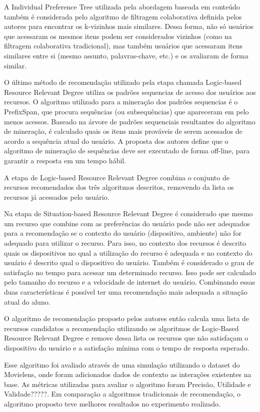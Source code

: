 A Individual Preference Tree utilizada pela abordagem baseada em conteúdo também é considerada pelo algoritmo de
filtragem colaborativa definida pelos autores para encontrar os k-vizinhos mais similares. Dessa forma, não só usuários
que acessaram os mesmos itens podem ser considerados vizinhos (como na filtragem colaborativa tradicional), mas também
usuários que acessaram itens similares entre si (mesmo assunto, palavras-chave, etc.) e os avaliaram de forma similar.

O último método de recomendação utilizado pela etapa chamada Logic-based Resource Relevant Degree utiliza os padrões
sequencias de acesso dos usuários aos recursos. O algoritmo utilizado para a mineração dos padrões sequencias é o
PrefixSpan, que procura sequências (ou subsequências) que apareceram em pelo menos  acessos. Baseado na árvore de
padrões sequenciais resultantes do algoritmo de mineração, é calculado quais os itens mais prováveis de serem acessados
de acordo a sequência atual do usuário. A proposta dos autores define que o algoritmo de mineração de sequências deve
ser executado de forma off-line, para garantir a resposta em um tempo hábil.

A etapa de Logic-based Resource Relevant Degree combina o conjunto de recursos recomendados dos três algoritmos
descritos, removendo da lista os recursos já acessados pelo usuário.

Na etapa de Situation-based Resource Relevant Degree é considerado que mesmo um recurso que combine com as preferências
do usuário pode não ser adequados para a recomendação se o contexto do usuário (dispositivo, ambiente) não for adequado
para utilizar o recurso. Para isso, no contexto dos recursos é descrito quais os dispositivos no qual a utilização do
recurso é adequada e no contexto do usuário é descrito qual o dispositivo do usuário. Também é considerado o grau de
satisfação no tempo para acessar um determinado recurso. Isso pode ser calculado pelo tamanho do recurso e a velocidade
de internet do usuário. Combinando essas duas características é possível ter uma recomendação mais adequada a situação
atual do aluno.

O algoritmo de recomendação proposto pelos autores então calcula uma lista de recursos candidatos a recomendação
utilizando os algoritmos de Logic-Based Resource Relevant Degree e remove dessa lista os recursos que não satisfaçam o
dispositivo do usuário e a satisfação mínima com o tempo de resposta esperado.

Esse algoritmo foi avaliado através de uma simulação utilizando o dataset do Movielens, onde foram adicionados dados de
contexto as interações existentes na base. As métricas utilizadas para avaliar o algoritmo foram Precisão, Utilidade e
Validade?????. Em comparação a algoritmos tradicionais de recomendação, o algoritmo proposto teve melhores resultados no
experimento realizado.


